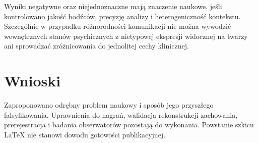 \documentclass[11pt,a4paper]{article}
\begin{document}
Wyniki negatywne oraz niejednoznaczne mają znaczenie naukowe, jeśli kontrolowano jakość bodźców, precyzję analizy i heterogeniczność kontekstu. Szczególnie w przypadku różnorodności komunikacji nie można wywodzić wewnętrznych stanów psychicznych z nietypowej ekspresji widocznej na twarzy ani sprowadzać zróżnicowania do jednolitej cechy klinicznej.
\section{Wnioski}
Zaproponowano odrębny problem naukowy i sposób jego przyszłego falsyfikowania. Uprawnienia do nagrań, walidacja rekonstrukcji zachowania, prerejestracja i badania obserwatorów pozostają do wykonania. Powstanie szkicu LaTeX nie stanowi dowodu gotowości publikacyjnej.
\printbibliography
\end{document}
